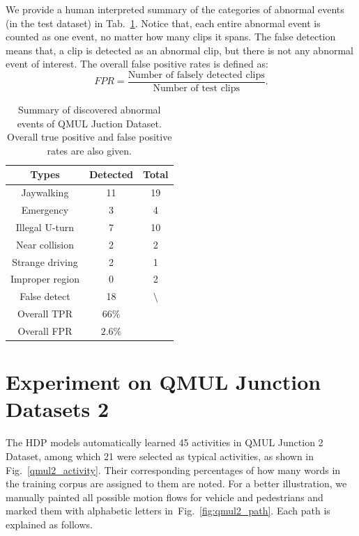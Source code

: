 We provide a human interpreted summary of the categories of abnormal events (in the test dataset) in Tab.~\ref{tab:qmul_discovered_abnormal}. Notice that, each entire abnormal event is counted as one event, no matter how many clips it spans. The false detection means that, a clip is detected as an abnormal clip, but there is not any abnormal event of interest. The overall false positive rates is defined as:
\begin{equation*}
	FPR = \frac{\mbox{Number of falsely detected clips}}{\mbox{Number of test clips}}.
\end{equation*}
\begin{table}[!htbp]
	\begin{center}
		\renewcommand\arraystretch{1.8}
		\setlength{\tabcolsep}{5pt}
		\begin{tabular}{|c| c|c|}
			\hline
			Types			& Detected		& Total\\
			\hline
			Jaywalking		& 11			& 19\\
			Emergency		& 3				& 4\\
			Illegal U-turn  & 7				& 10\\
			Near collision  & 2				& 2\\ 
			Strange driving & 2				& 1\\
			Improper region & 0				& 2\\
			False detect    & 18            & $\setminus$\\
			\hline
			Overall TPR     &$66\%$			&\\
			Overall FPR     &$2.6\%$		&\\
			\hline
		\end{tabular}
	\end{center}
	\caption[Summary of discovered abnormal events QMUL Juction Dataset]
	{Summary of discovered abnormal events of QMUL Juction Dataset. Overall true positive and false positive rates are also given.}
	\label{tab:qmul_discovered_abnormal} 
\end{table}

\clearpage
\newpage
\section{Experiment on QMUL Junction Datasets 2}
\label{exp:qmul2} 
The HDP models automatically learned 45 activities in QMUL Junction 2 Dataset, among which 21 were selected as typical activities, as shown in Fig.~\ref{qmul2_activity}. Their corresponding percentages of how many words in the training corpus are assigned to them are noted. For a better illustration, we manually painted all possible motion flows for vehicle and pedestrians and marked them with alphabetic letters in~Fig.~\ref{fig:qmul2_path}. Each path is explained as follows.

